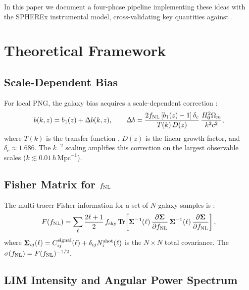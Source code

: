 \documentclass[12pt]{article}
\begin{document}
In this paper we document a four-phase pipeline implementing these ideas
with the SPHEREx instrumental model, cross-validating key quantities against
\citet{Cheng2024}.

\section{Theoretical Framework}
\label{sec:theory}

\subsection{Scale-Dependent Bias}

For local PNG, the galaxy bias acquires a scale-dependent correction
\citep{Dalal2008}:
\begin{equation}
    b(k, z) = b_1(z) + \Delta b(k, z), \qquad
    \Delta b = \frac{2 f_{\rm NL}\, [b_1(z) - 1]\, \delta_c}
                    {T(k)\, D(z)}\, \frac{H_0^2 \Omega_m}{k^2 c^2},
\label{eq:scaledepbias}
\end{equation}
where $T(k)$ is the transfer function \citep{EisensteinHu1998}, $D(z)$ is the
linear growth factor, and $\delta_c \approx 1.686$.  The $k^{-2}$ scaling
amplifies this correction on the largest observable scales ($k \lesssim 0.01\,h\,\mathrm{Mpc}^{-1}$).

\subsection{Fisher Matrix for $f_{\rm NL}$}

The multi-tracer Fisher information for a set of $N$ galaxy samples is
\citep{Seljak2009}:
\begin{equation}
    F(f_{\rm NL}) = \sum_\ell \frac{2\ell+1}{2}\, f_{\rm sky}\,
    \mathrm{Tr}\!\left[
        \mathbf{\Sigma}^{-1}(\ell)\,
        \frac{\partial\mathbf{\Sigma}}{\partial f_{\rm NL}}\,
        \mathbf{\Sigma}^{-1}(\ell)\,
        \frac{\partial\mathbf{\Sigma}}{\partial f_{\rm NL}}
    \right],
\label{eq:fisher}
\end{equation}
where $\mathbf{\Sigma}_{ij}(\ell) = C_{ij}^{\rm signal}(\ell) + \delta_{ij}
N_i^{\rm shot}(\ell)$ is the $N \times N$ total covariance.  The
$\sigma(f_{\rm NL}) = F(f_{\rm NL})^{-1/2}$.

\subsection{LIM Intensity and Angular Power Spectrum}
\end{document}
